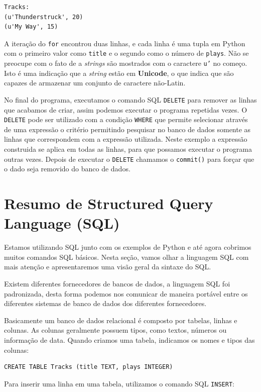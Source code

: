 \beforeverb
\begin{verbatim}
Tracks:
(u'Thunderstruck', 20)
(u'My Way', 15)
\end{verbatim}
\afterverb
%

A iteração do {\tt for} encontrou duas linhas, e cada linha é uma tupla em
Python com o primeiro valor como {\tt title} e o segundo como o número de
{\tt plays}. Não se preocupe com o fato de a {\it strings} são mostrados com
o caractere {\tt u'} no começo. Isto é uma indicação que a {\it string} estão
em {\bf Unicode}, o que indica que são capazes de armazenar um conjunto de
caractere não-Latin.

No final do programa, executamos o comando SQL {\tt DELETE} para remover as
linhas que acabamos de criar, assim podemos executar o programa repetidas
vezes. O {\tt DELETE} pode ser utilizado com a condição {\tt WHERE} que permite
selecionar através de uma expressão o critério permitindo pesquisar no banco
de dados somente as linhas que correspondem com a expressão utilizada. Neste
exemplo a expressão construida se aplica em todas as linhas, para que possamos
executar o programa outras vezes. Depois de executar o {\tt DELETE} chamamos o
{\tt commit()} para forçar que o dado seja removido do banco de dados.

\section{Resumo de Structured Query Language (SQL)}

Estamos utilizando SQL junto com os exemplos de Python e até agora cobrimos
muitos comandos SQL básicos. Nesta seção, vamos olhar a linguagem SQL com
mais atenção e apresentaremos uma visão geral da sintaxe do SQL.

Existem diferentes fornecedores de bancos de dados, a linguagem SQL foi
padronizada, desta forma podemos nos comunicar de maneira portável entre os
diferentes sistemas de banco de dados dos diferentes fornecedores.

Basicamente um banco de dados relacional é composto por tabelas, linhas e
colunas. As colunas geralmente possuem tipos, como textos, números ou
informação de data. Quando criamos uma tabela, indicamos os nomes e tipos das
colunas:

\beforeverb
\begin{verbatim}
CREATE TABLE Tracks (title TEXT, plays INTEGER)
\end{verbatim}
\afterverb
%
Para inserir uma linha em uma tabela, utilizamos o comando SQL {\tt INSERT}:

